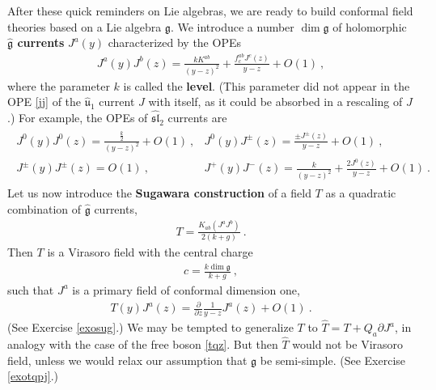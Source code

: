 \documentclass[12pt, a4paper, notitlepage, twoside]{report}
\numberwithin{equation}{section}
\theoremstyle{break}
\begin{document}
After these quick reminders on Lie algebras, we are ready to build conformal field theories based on a Lie algebra $\mathfrak{g}$. 
We introduce a number $\dim \mathfrak{g}$ of holomorphic \textbf{\boldmath $\hat{\mathfrak{g}}$ currents} $J^a(y)$ characterized by the OPEs 
\begin{align}
 \boxed{ J^a(y) J^b(z) = \frac{k K^{ab}}{(y-z)^2} +  \frac{ f^{ab}_c J^c(z)}{y-z}  + O(1)} \ ,
\label{jajb}
\end{align}
where the parameter $k$ is called the \textbf{level}. (This parameter did not appear in the OPE \eqref{jj} of the $\hat{\mathfrak{u}}_1$ current $J$ with itself, as it could be absorbed in a rescaling of $J$.) For example, the OPEs of $\widehat{\mathfrak{sl}}_2$ currents are
\begin{align}
\begin{array}{ll}
  J^0(y)J^0(z) = \frac{\frac{k}{2}}{(y-z)^2} + O(1)\ ,  & J^0(y)J^\pm(z) = \frac{\pm J^\pm(z)}{y-z} + O(1)\ ,
\\
 J^\pm(y)J^\pm(z) = O(1) \ , & J^+(y)J^-(z) = \frac{k}{(y-z)^2} + \frac{2J^0(z)}{y-z} + O(1)\ .
\end{array}
\label{jjjj}
\end{align}
Let us now introduce the \textbf{\boldmath Sugawara construction} of a field $T$ as a quadratic combination of $\hat{\mathfrak{g}}$ currents,
\begin{align}
\boxed{ T =  \frac{ K_{ab} (J^aJ^b)}{2(k+g)} } \ .
\label{tjj} 
\end{align}
Then $T$ is a Virasoro field with the central charge 
\begin{align}
 \boxed{ c = \frac{ k \dim \mathfrak{g}}{k+g} }\ ,
\label{ckg}
\end{align}
such that $J^a$ is a primary field of conformal dimension one, 
\begin{align}
\boxed{ T(y)J^a(z) = {\frac{\partial}{\partial z}} \frac{1}{y-z} J^a(z) + O(1)} \ .
\label{tja}
\end{align}
(See Exercise \ref{exosug}.)
We may be tempted to generalize $T$ to $\hat{T} = T + Q_a\partial J^a$, in analogy with the case of the free boson \eqref{tqz}. 
But then $\hat{T}$ would not be Virasoro field, unless we would relax our assumption that $\mathfrak{g}$ be semi-simple. (See Exercise \ref{exotqpj}.)
\end{document}
